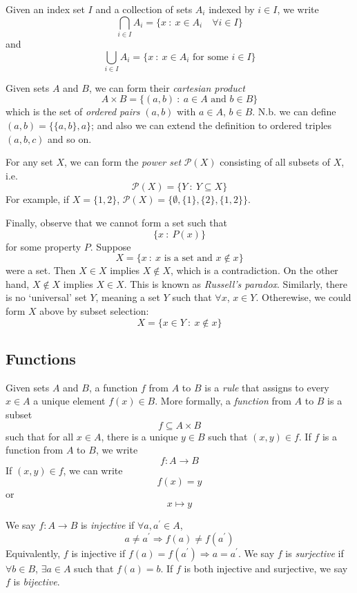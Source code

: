 \documentclass[10pt, a4paper, twoside]{report}
\begin{document}
Given an index set \(I\) and a collection of sets \(A_i\) indexed by \(i\in I\), we write 
\[\bigcap_{i\in I}A_i=\{x\::\:x\in A_i\quad\forall i\in I\}\]
and 
\[\bigcup_{i\in I}A_i=\{x\::\:x\in A_i\text{ for some  }i\in I\}\]

Given sets \(A\) and \(B\), we can form their \emph{cartesian product}
\[A\times B=\{(a,b)\::\:a\in A\text{  and  }b\in B\}\]
which is the set of \emph{ordered pairs} \((a,b)\) with \(a\in A\), \(b\in B\). N.b. we can define \((a,b)=\{\{a,b\},a\}\); and also we can extend the definition to ordered triples \((a,b,c)\) and so on.

For any set \(X\), we can form the \emph{power set} \(\mathcal{P}(X)\) consisting of all subsets of \(X\), i.e. 
\[\mathcal{P}(X)=\{Y\::\:Y\subseteq X\}\]
For example, if \(X=\{1,2\}\), \(\mathcal{P}(X)=\{\emptyset,\{1\},\{2\},\{1,2\}\}\).

Finally, observe that we cannot form a set such that 
\[\{x\::\:P(x)\}\]
for some property \(P\). Suppose
\[X=\{x\::\:\text{\(x\) is a set and \(x\notin x\)}\}\]
were a set. Then \(X\in X\) implies \(X\notin X\), which is a contradiction. On the other hand, \(X\notin X\) implies \(X\in X\). This is known as \emph{Russell's paradox}. Similarly, there is no `universal' set \(Y\), meaning a set \(Y\) such that \(\forall x\), \(x\in Y\). Otherewise, we could form \(X\) above by subset selection:
\[X=\{x\in Y\::\:x\notin x\}\]
\subsection{Functions}
Given sets \(A\) and \(B\), a function \(f\) from \(A\) to \(B\) is a \emph{rule} that assigns to every \(x\in A\) a unique element \(f(x)\in B\). More formally, a \emph{function} from \(A\) to \(B\) is a subset
\[f\subseteq A\times B\]
such that for all \(x\in A\), there is a unique \(y\in B\) such that \((x,y)\in f\). If \(f\) is a function from \(A\) to \(B\), we write 
\[f:A\to B\]
If \((x,y)\in f\), we can write 
\[f(x)=y\]
or 
\[x\mapsto y\]

We say \(f:A\to B\) is \emph{injective} if \(\forall a,a^\prime\in A\), \[a\neq a^\prime\Rightarrow f(a)\neq f(a^\prime)\]
Equivalently, \(f\) is injective if \(f(a)=f(a^\prime)\Rightarrow a=a^\prime\). We say \(f\) is \emph{surjective} if \(\forall b\in B\), \(\exists a\in A\) such that \(f(a)=b\). If \(f\) is both injective and surjective, we say \(f\) is \emph{bijective}.
\end{document}
